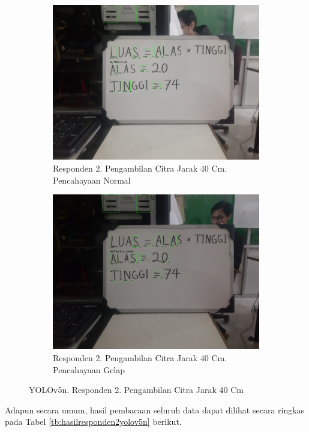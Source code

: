 \begin{figure}[H]
  \begin{subfigure}{.5\textwidth}
    \centering
    \captionsetup{width=.8\linewidth}
    \includegraphics[width=.8\linewidth]{gambar/yolov5n/responden2/ghiyas40cm00-result.jpg}
    \caption{Responden 2. Pengambilan Citra Jarak 40 Cm. Pencahayaan Normal}
    \label{fig:nr2tcitra40cm}
  \end{subfigure}%
  \begin{subfigure}{.5\textwidth}
    \centering
    \captionsetup{width=.8\linewidth}
    \includegraphics[width=.8\linewidth]{gambar/yolov5n/responden2/ghiyas40cm10-result.jpg}
    \caption{Responden 2. Pengambilan Citra Jarak 40 Cm. Pencahayaan Gelap}
    \label{fig:nr2gcitra40cm}
  \end{subfigure}
  \caption{YOLOv5n. Responden 2. Pengambilan Citra Jarak 40 Cm}
  \label{fig:nr2citra40cm}
\end{figure}

Adapun secara umum, hasil pembacaan seluruh data dapat dilihat secara ringkas pada Tabel \ref*{tb:hasilresponden2yolov5n} berikut.

